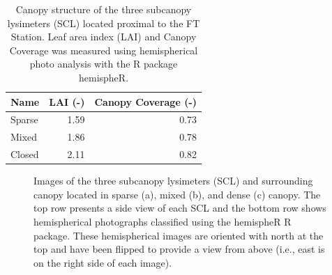 \documentclass[
  letterpaper,
  DIV=11,
  numbers=noendperiod]{scrartcl}
\begin{document}
\begin{longtable}[]{@{}lrr@{}}

\caption{\label{tbl-scl-lai-cc}Canopy structure of the three subcanopy
lysimeters (SCL) located proximal to the FT Station. Leaf area index
(LAI) and Canopy Coverage was measured using hemispherical photo
analysis with the R package hemispheR.}

\tabularnewline

\toprule\noalign{}
Name & LAI (-) & Canopy Coverage (-) \\
\midrule\noalign{}
\endhead
\bottomrule\noalign{}
\endlastfoot
Sparse & 1.59 & 0.73 \\
Mixed & 1.86 & 0.78 \\
Closed & 2.11 & 0.82 \\

\end{longtable}

\begin{figure}


\caption{\label{fig-scl-imgs}Images of the three subcanopy lysimeters
(SCL) and surrounding canopy located in sparse (a), mixed (b), and dense
(c) canopy. The top row presents a side view of each SCL and the bottom
row shows hemispherical photographs classified using the hemispheR R
package. These hemispherical images are oriented with north at the top
and have been flipped to provide a view from above (i.e., east is on the
right side of each image).}

\end{figure}%
\end{document}
